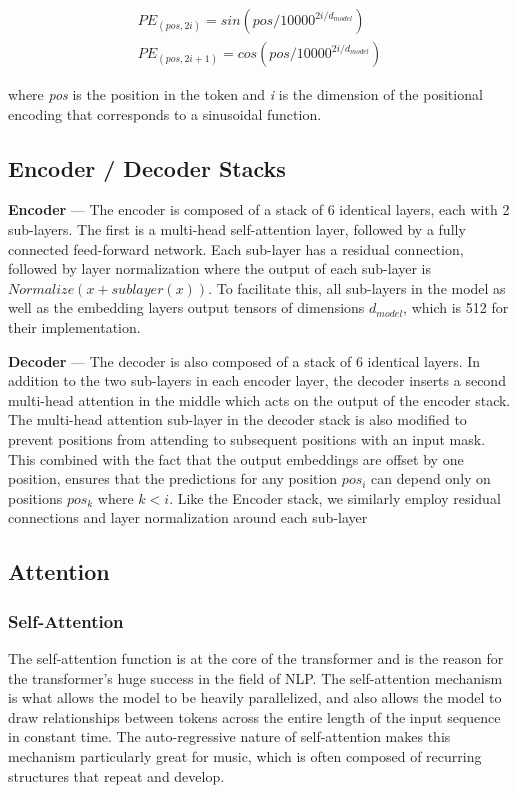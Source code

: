 \documentclass[../main.tex]{subfiles}
\begin{document}
{\large
\begin{align*} 
\label{eq:1.1}
PE_{(pos,2i)} = sin(pos/10000^{2i/d_{model}} ) \\
PE_{(pos,2i+1)} = cos(pos/10000^{2i/d_{model}} )
\tag{1.1}
\end{align*}
}

where \textit{pos} is the position in the token and \textit{i} is the dimension of the positional encoding that corresponds to a sinusoidal function. 


\subsection{Encoder / Decoder Stacks }

\textbf{Encoder} — The encoder is composed of a stack of 6 identical layers, each with 2 sub-layers. The first is a multi-head self-attention layer, followed by a fully connected feed-forward network. Each sub-layer has a residual connection, followed by layer normalization where the output of each sub-layer is $Normalize(x + sublayer(x))$. To facilitate this, all sub-layers in the model as well as the embedding layers output tensors of dimensions $d_{model}$, which is 512 for their implementation.

\vspace{0.5cm} \noindent
\textbf{Decoder} — The decoder is also composed of a stack of 6 identical layers. In addition to the two sub-layers in each encoder layer, the decoder inserts a second multi-head attention in the middle which acts on the output of the encoder stack. The multi-head attention sub-layer in the decoder stack is also modified to prevent positions from attending to subsequent positions with an input mask. This combined with the fact that the output embeddings are offset by one position, ensures that the predictions for any position $pos_i$ can depend only on positions $pos_k$ where $k<i$. Like the Encoder stack, we similarly employ residual connections and layer normalization around each sub-layer

\subsection{Attention}

\subsubsection{Self-Attention}
The self-attention function is at the core of the transformer and is the reason for the transformer's huge success in the field of NLP. The self-attention mechanism is what allows the model to be heavily parallelized, and also allows the model to draw relationships between tokens across the entire length of the input sequence in constant time. The auto-regressive nature of self-attention makes this mechanism particularly great for music, which is often composed of recurring structures that repeat and develop. 
\end{document}
